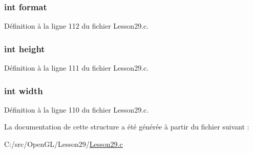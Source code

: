 \hypertarget{struct_t_e_x_t_u_r_e___i_m_a_g_e_a317afff57d87a89158c2b038d37b2b08}{}
\subsubsection[{format}]{\setlength{\rightskip}{0pt plus 5cm}int format}\label{struct_t_e_x_t_u_r_e___i_m_a_g_e_a317afff57d87a89158c2b038d37b2b08}


Définition à la ligne 112 du fichier Lesson29.\+c.

\hypertarget{struct_t_e_x_t_u_r_e___i_m_a_g_e_ad12fc34ce789bce6c8a05d8a17138534}{}
\subsubsection[{height}]{\setlength{\rightskip}{0pt plus 5cm}int height}\label{struct_t_e_x_t_u_r_e___i_m_a_g_e_ad12fc34ce789bce6c8a05d8a17138534}


Définition à la ligne 111 du fichier Lesson29.\+c.

\hypertarget{struct_t_e_x_t_u_r_e___i_m_a_g_e_a2474a5474cbff19523a51eb1de01cda4}{}
\subsubsection[{width}]{\setlength{\rightskip}{0pt plus 5cm}int width}\label{struct_t_e_x_t_u_r_e___i_m_a_g_e_a2474a5474cbff19523a51eb1de01cda4}


Définition à la ligne 110 du fichier Lesson29.\+c.



La documentation de cette structure a été générée à partir du fichier suivant \+:\begin{DoxyCompactItemize}
\item 
C\+:/src/\+Open\+G\+L/\+Lesson29/\hyperlink{_lesson29_8c}{Lesson29.\+c}\end{DoxyCompactItemize}
